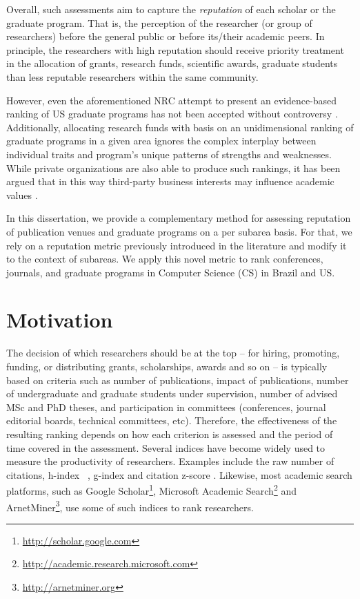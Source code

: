 \documentclass[msc]{ppgccufmg}
\begin{document}
Overall, such assessments aim to capture the \textit{reputation} of each scholar or the graduate program. That is, the perception of the researcher (or group of researchers) before the general public or before its/their academic peers. In principle, the researchers with high reputation should receive priority treatment in the allocation of grants, research funds, scientific awards, graduate students than less reputable researchers within the same community.

However, even the aforementioned NRC attempt to present an evidence-based ranking of US graduate programs has not been accepted without controversy \citep{vardi17}. Additionally, allocating research funds with basis on an unidimensional ranking of graduate programs in a given area ignores the complex interplay between individual traits and program's unique patterns of strengths and weaknesses. While private organizations are also able to produce such rankings, it has been argued that in this way third-party business interests may influence academic values \citep{brembs13}.

In this dissertation, we provide a complementary method for assessing reputation of publication venues and graduate programs on a per subarea basis. For that, we rely on a reputation metric previously introduced in the literature \citep{ribas2015random} and modify it to the context of subareas. We apply this novel metric to rank conferences, journals, and graduate programs in Computer Science (CS) in Brazil and US.

\section{Motivation}

The decision of which researchers should be at the top -- for hiring, promoting, funding, or distributing grants, scholarships, awards and so on -- is typically based on criteria such as number of publications, impact of publications, number of undergraduate and graduate students under supervision, number of advised MSc and PhD theses, and participation in committees (conferences, journal editorial boards, technical committees, etc). 
%
Therefore, the effectiveness of the resulting ranking depends on how each criterion is assessed and the period of time covered in the assessment. Several indices have become widely used to measure the productivity of researchers. Examples include the raw number of citations, h-index ~\citep{hirsch2005}, g-index \citep{egghe2006theory} and citation z-score \citep{zscore}. Likewise, most academic search platforms, such as Google Scholar\footnote{\url{http://scholar.google.com}}, Microsoft Academic Search\footnote{\url{http://academic.research.microsoft.com}} and ArnetMiner\footnote{\url{http://arnetminer.org}}, use some of such indices to rank researchers.
\end{document}

